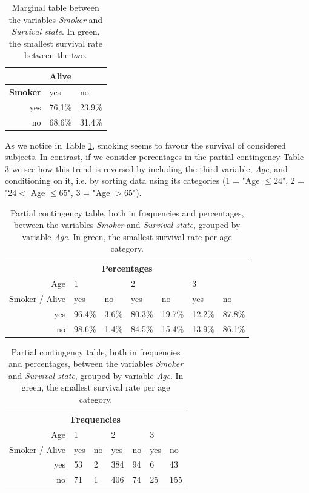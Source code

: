 \begin{table}[!ht]
    \centering
    \caption{Marginal table between the variables \textit{Smoker} and \textit{Survival state}. In green, the smallest survival rate between the two.}
    \begin{tabular}{r|ll}
        \textbf{} & \textbf{Alive} & \textbf{} \\ \hline
        \textbf{Smoker} & yes & no \\ \hline
        yes & 76,1\% & 23,9\% \\ 
        no & \color{Green}68,6\% & 31,4\% \\ 
    \end{tabular}
    \label{sp1}
\end{table}

As we notice in Table \ref{sp1}, smoking seems to favour the survival of considered subjects. In contrast, if we consider percentages in the partial contingency Table \ref{sp2} we see how this trend is reversed by including the third variable, \textit{Age}, and conditioning on it, i.e. by sorting data using its categories (1 = "Age $\leq 24$", 2 = "$24 <$ Age $\leq 65$", 3 = "Age $> 65$").

\begin{table}[!ht]
    \centering
    \caption{Partial contingency table, both in frequencies and percentages,  between the variables \textit{Smoker} and \textit{Survival state}, grouped by variable \textit{Age}. In green, the smallest survival rate per age category.}
    \begin{tabular}{r|ll|ll|ll}
        \multicolumn{7}{c}{\textbf{Percentages}} \\
        Age &  1 & ~ & 2 & ~ & 3 & ~ \\ \hline
        Smoker / Alive & yes & no & yes & no & yes & no \\ \hline
        yes & \color{Green}96.4\% & 3.6\% & \color{Green}80.3\% & 19.7\% & \color{Green}12.2\% & 87.8\% \\
        no & 98.6\% & 1.4\% & 84.5\% & 15.4\% & 13.9\% & 86.1\% \\
    \end{tabular}
    
    \vspace{1cm}
    
    \begin{tabular}{r|ll|ll|ll}
        \multicolumn{7}{c}{\textbf{Frequencies}} \\
        Age &  1 & ~ & 2 & ~ & 3 & ~ \\ \hline
        Smoker / Alive & yes & no & yes & no & yes & no \\ \hline
        yes & 53 & 2 & 384 & 94 & 6 & 43 \\
        no & 71 & 1 & 406 & 74 & 25 & 155 \\
    \end{tabular}
    \label{sp2}
\end{table}


